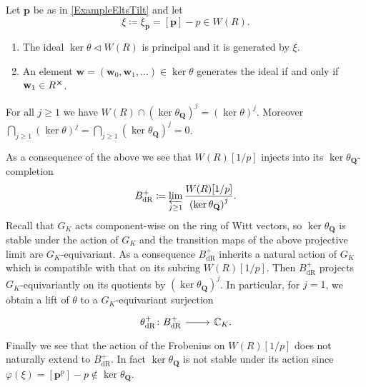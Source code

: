 \begin{prop}
	Let $\mathbf{p}$ be as in \cref{ExampleEltsTilt} and let
	\begin{equation*}
		\xi \coloneqq \xi_{\mathbf{p}} = [\mathbf{p}] - p \in W(R)
	.\end{equation*}
\begin{enumerate}
	\item The ideal $\ker \theta \triangleleft W(R)$ is principal and it is generated
		by $\xi$.
	\item An element $\mathbf{w} = (\mathbf{w}_0, \mathbf{w}_1, \ldots) \in \ker\theta$ generates
		the ideal if and only if $\mathbf{w}_1 \in R^{\cross}$.
\end{enumerate}
\end{prop}


\begin{cor}
	For all $j \geq 1$ we have $W(R) \cap \left( \ker \theta_{\mathbf{Q}} \right)^j =
	\left( \ker \theta \right)^j$.
	Moreover $\bigcap_{j \geq 1} \left( \ker \theta \right)^j =
	\bigcap_{j \geq 1} \left( \ker \theta_{\mathbf{Q}} \right)^j = 0$.
\end{cor} 


\begin{rem}[]\label{kerQGKStable}
	As a consequence of the above we see that $W(R)[1/p]$
	injects into its $\ker \theta_{\mathbf{Q}}$-completion
	\begin{equation*}
	B^+_{\mathrm{dR}} \coloneqq \varprojlim_{j \geq 1}
	\frac{ W(R)[1/p] }{ \left( \ker \theta_{\mathbf{Q}} \right)^j }
	.\end{equation*}
	Recall that $G_K$ acts component-wise on the ring of Witt vectors,
	so $\ker \theta_{\mathbf{Q}}$ is stable under the action of $G_K$
	and the transition maps of the above projective limit are $G_K$-equivariant.
	As a consequence $B^+_{\mathrm{dR}}$ inherits a natural action of $G_K$
	which is compatible with that on its subring $W(R)[1/p]$.
	Then $B^+_{\mathrm{dR}}$ projects $G_K$-equivariantly on its quotients
	by $\left( \ker \theta_{\mathbf{Q}} \right)^j$.
	In particular, for $j = 1$, we obtain a lift of $\theta$ 
	to a $G_K$-equivariant surjection
	\begin{equation*}
	\begin{tikzcd}[row sep = 0ex
		,/tikz/column 1/.append style={anchor=base east}
		,/tikz/column 2/.append style={anchor=base west}]
		\theta^+_{\mathrm{dR}}\colon B^+_{\mathrm{dR}} \arrow[r, "", rightarrow] &
		\mathbb{C}_K
	.\end{tikzcd}
	\end{equation*} 
	Finally we see that the action of the Frobenius on $W(R)[1/p]$
	does not naturally extend to $B^+_{\mathrm{dR}}$.
	In fact $\ker \theta_{\mathbf{Q}}$ is not stable under its action
	since $\varphi(\xi) = [\mathbf{p}^p] - p \notin \ker \theta_{\mathbf{Q}}$.
\end{rem}


